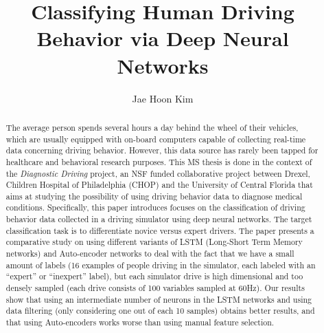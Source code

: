 \documentclass[draft,dvipsnames]{drexel-thesis}
\author{Jae Hoon Kim}
\title{Classifying Human Driving Behavior via Deep Neural Networks}
\begin{document}
\begin{preamble}



\tableofcontents
\listoftables
\listoffigures


\begin{abstract}
The average person spends several hours a day behind the wheel of their vehicles, which are usually equipped with on-board computers capable of collecting real-time data concerning driving behavior. However, this data source has rarely been tapped for healthcare and behavioral research purposes. This MS thesis is done in the context of the {\em Diagnostic Driving} project, an NSF funded collaborative project between Drexel, Children Hospital of Philadelphia (CHOP) and the University of Central Florida that aims at studying the possibility of using driving behavior data to diagnose medical conditions. 
%
Specifically, this paper introduces focuses on the classification of driving behavior data collected in a driving simulator using deep neural networks. The target classification task is to differentiate novice versus expert drivers. The paper presents a comparative study on using different variants of LSTM (Long-Short Term Memory networks) and Auto-encoder networks to deal with the fact that we have a small amount of labels (16 examples of people driving in the simulator, each labeled with an ``expert'' or ``inexpert'' label), but each simulator drive is high dimensional and too densely sampled (each drive consists of 100 variables sampled at 60Hz).
%
Our results show that using an intermediate number of neurons in the LSTM networks and using data filtering (only considering one out of each 10 samples) obtains better results, and that using Auto-encoders works worse than using manual feature selection.
\end{abstract}
\end{preamble}
\end{document}
